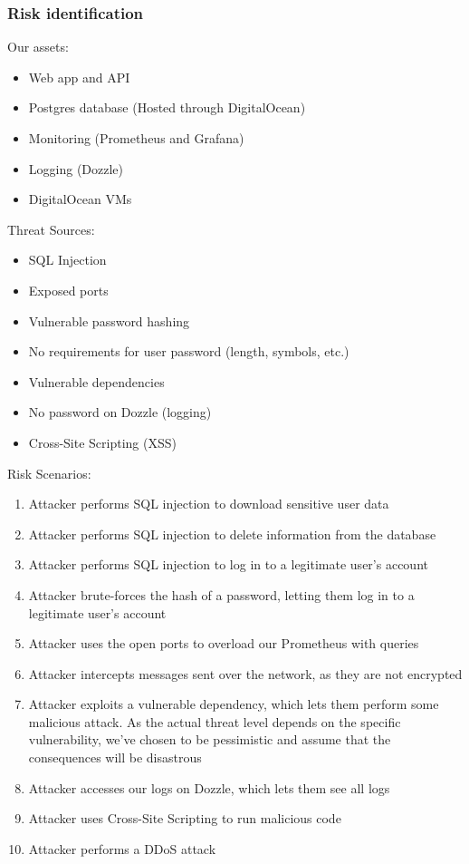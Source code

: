 \subsubsection{Risk identification}
Our assets:
\begin{itemize}
    \item Web app and API
    \item Postgres database (Hosted through DigitalOcean)
    \item Monitoring (Prometheus and Grafana)
    \item Logging (Dozzle)
    \item DigitalOcean VMs
\end{itemize}

Threat Sources:
\begin{itemize}
    \item SQL Injection
    \item Exposed ports 
    \item Vulnerable password hashing
    \item No requirements for user password (length, symbols, etc.)
    \item Vulnerable dependencies
    \item No password on Dozzle (logging)
    \item Cross-Site Scripting (XSS)
\end{itemize}

Risk Scenarios:
\begin{enumerate}[label=\textbf{\Alph*}]
    \item Attacker performs SQL injection to download sensitive user data
    \item Attacker performs SQL injection to delete information from the database
    \item Attacker performs SQL injection to log in to a legitimate user's account
    \item Attacker brute-forces the hash of a password, letting them log in to a legitimate user's account
    \item Attacker uses the open ports to overload our Prometheus with queries
    \item Attacker intercepts messages sent over the network, as they are not encrypted
    \item Attacker exploits a vulnerable dependency, which lets them perform some malicious attack. As the actual threat level depends on the specific vulnerability, we've chosen to be pessimistic and assume that the consequences will be disastrous
    \item Attacker accesses our logs on Dozzle, which lets them see all logs
    \item Attacker uses Cross-Site Scripting to run malicious code
    \item Attacker performs a DDoS attack
\end{enumerate}

